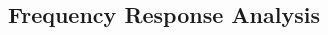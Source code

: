 \begin{multicols}{2}
{        %

    }


\end{multicols}


\newpage
\subsection{Frequency Response Analysis}%
\label{sub:freq-response-analysis}

\begin{multicols}{2}


\end{multicols}

